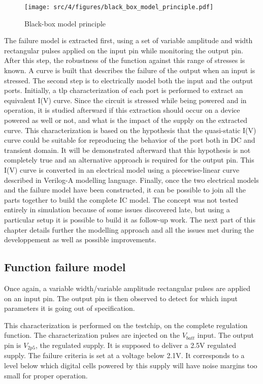 \begin{figure}[!h]
  \centering
  \texttt{[image: src/4/figures/black\_box\_model\_principle.pdf]}
  \caption{Black-box model principle}
  \label{fig:black-box-principle}
\end{figure}

The failure model is extracted first, using a set of variable amplitude and width rectangular pulses applied on the input pin while monitoring the output pin.
After this step, the robustness of the function against this range of stresses is known.
A curve is built that describes the failure of the output when an input is stressed.
The second step is to electrically model both the input and the output ports.
Initially, a \gls{tlp} characterization of each port is performed to extract an equivalent I(V) curve.
Since the circuit is stressed while being powered and in operation, it is studied afterward if this extraction should occur on a device powered as well or not, and what is the impact of the supply on the extracted curve.
This characterization is based on the hypothesis that the quasi-static I(V) curve could be suitable for reproducing the behavior of the port both in DC and transient domain.
It will be demonstrated afterward that this hypothesis is not completely true and an alternative approach is required for the output pin.
This I(V) curve is converted in an electrical model using a piecewise-linear curve described in Verilog-A modelling language.
Finally, once the two electrical models and the failure model have been constructed, it can be possible to join all the parts together to build the complete IC model.
The concept was not tested entirely in simulation because of some issues discovered late, but using a particular setup it is possible to build it as follow-up work.
The next part of this chapter details further the modelling approach and all the issues met during the developpement as well as possible improvements.

\subsection{Function failure model}

Once again, a variable width/variable amplitude rectangular pulses are applied on an input pin.
The output pin is then observed to detect for which input parameters it is going out of specification.

This characterization is performed on the testchip, on the complete regulation function.
The characterization pulses are injected on the $V_{batt}$ input.
The output pin is $V_{2p5}$, the regulated supply.
It is supposed to deliver a 2.5V regulated supply.
The failure criteria is set at a voltage below 2.1V.
It corresponds to a level below which digital cells powered by this supply will have noise margins too small for proper operation.

